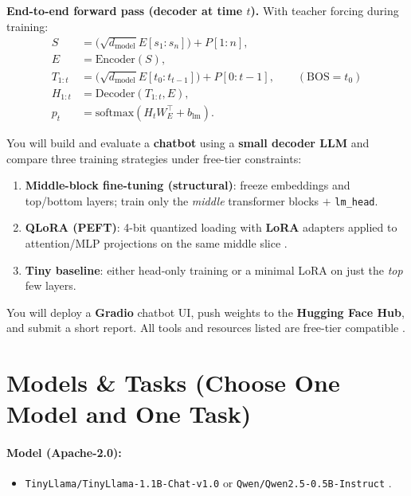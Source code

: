 \documentclass[11pt]{article}
\begin{document}
\vspace{1em}
\noindent\textbf{End-to-end forward pass (decoder at time $t$).} With teacher forcing during training:
\begin{align}
S &= \big(\sqrt{d_{\text{model}}}E[s_1{:}s_n]\big) + P[1{:}n], \\
E &= \mathrm{Encoder}(S), \\
T_{1{:}t} &= \big(\sqrt{d_{\text{model}}}E[t_0{:}t_{t-1}]\big) + P[0{:}t-1], \qquad (\text{BOS}=t_0) \\
H_{1{:}t} &= \mathrm{Decoder}(T_{1{:}t}, E), \\
p_t &= \mathrm{softmax}\!\left(H_t W_E^{\top} + b_{\text{lm}}\right).
\label{eq:seq2seq_flow}
\end{align}

You will build and evaluate a \textbf{chatbot} using a \textbf{small decoder LLM} and compare three training strategies under free-tier constraints:
\begin{enumerate}[label=\textbf{A.\,}]
  \item \textbf{Middle-block fine-tuning (structural)}: freeze embeddings and top/bottom layers; train only the \emph{middle} transformer blocks $+$ \texttt{lm\_head}.
  \item \textbf{QLoRA (PEFT)}: 4-bit quantized loading with \textbf{LoRA} adapters applied to attention/MLP projections on the same middle slice \cite{dettmers2023qlora,hu2021lora}.
  \item \textbf{Tiny baseline}: either head-only training or a minimal LoRA on just the \emph{top} few layers.
\end{enumerate}

You will deploy a \textbf{Gradio} chatbot UI, push weights to the \textbf{Hugging Face Hub}, and submit a short report. All tools and resources listed are free-tier compatible \cite{wolf2020transformers,gradio,bitsandbytes,hfhub}.

\section*{Models \& Tasks (Choose One Model and One Task)}
\paragraph{Model (Apache-2.0):}
\begin{itemize}
  \item \texttt{TinyLlama/TinyLlama-1.1B-Chat-v1.0} \cite{tinyllama} \quad or \quad \texttt{Qwen/Qwen2.5-0.5B-Instruct} \cite{qwen25}.
\end{itemize}
\end{document}
